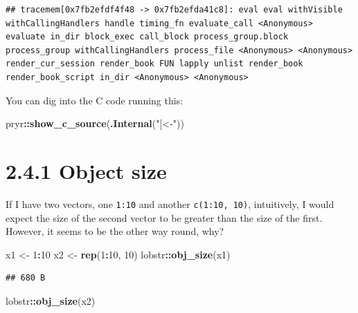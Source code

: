 \documentclass[]{book}
\newenvironment{Shaded}{\begin{snugshade}}{\end{snugshade}}
\newcommand{\DecValTok}[1]{\textcolor[rgb]{0.00,0.00,0.81}{#1}}
\newcommand{\KeywordTok}[1]{\textcolor[rgb]{0.13,0.29,0.53}{\textbf{#1}}}
\newcommand{\NormalTok}[1]{#1}
\newcommand{\OperatorTok}[1]{\textcolor[rgb]{0.81,0.36,0.00}{\textbf{#1}}}
\newcommand{\StringTok}[1]{\textcolor[rgb]{0.31,0.60,0.02}{#1}}
\begin{document}
\begin{verbatim}
## tracemem[0x7fb2efdf4f48 -> 0x7fb2efda41c8]: eval eval withVisible withCallingHandlers handle timing_fn evaluate_call <Anonymous> evaluate in_dir block_exec call_block process_group.block process_group withCallingHandlers process_file <Anonymous> <Anonymous> render_cur_session render_book FUN lapply unlist render_book render_book_script in_dir <Anonymous> <Anonymous>
\end{verbatim}

You can dig into the C code running this:

\begin{Shaded}
\begin{Highlighting}[]
\NormalTok{pryr}\OperatorTok{::}\KeywordTok{show_c_source}\NormalTok{(}\KeywordTok{.Internal}\NormalTok{(}\StringTok{"[<-"}\NormalTok{))}
\end{Highlighting}
\end{Shaded}

\hypertarget{object-size}{%
\section*{2.4.1 Object size}\label{object-size}}

If I have two vectors, one \texttt{1:10} and another \texttt{c(1:10,\ 10)}, intuitively, I would expect the size of the second vector to be greater than the size of the first. However, it seems to be the other way round, why?

\begin{Shaded}
\begin{Highlighting}[]
\NormalTok{x1 <-}\StringTok{ }\DecValTok{1}\OperatorTok{:}\DecValTok{10}
\NormalTok{x2 <-}\StringTok{ }\KeywordTok{rep}\NormalTok{(}\DecValTok{1}\OperatorTok{:}\DecValTok{10}\NormalTok{, }\DecValTok{10}\NormalTok{)}
\NormalTok{lobstr}\OperatorTok{::}\KeywordTok{obj_size}\NormalTok{(x1)}
\end{Highlighting}
\end{Shaded}

\begin{verbatim}
## 680 B
\end{verbatim}

\begin{Shaded}
\begin{Highlighting}[]
\NormalTok{lobstr}\OperatorTok{::}\KeywordTok{obj_size}\NormalTok{(x2)}
\end{Highlighting}
\end{Shaded}
\end{document}
